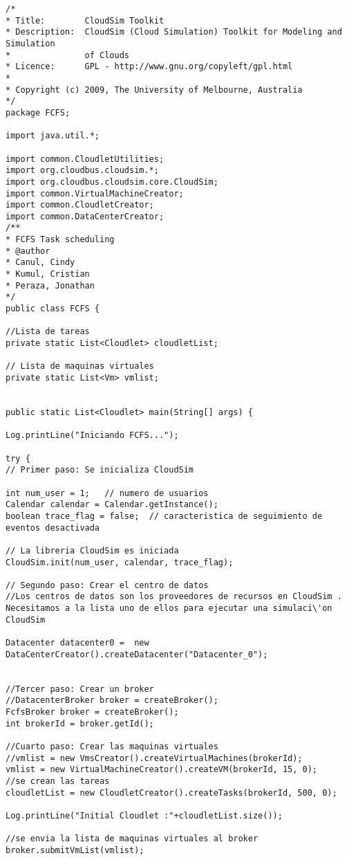 \begin{lstlisting}
/*
* Title:        CloudSim Toolkit
* Description:  CloudSim (Cloud Simulation) Toolkit for Modeling and Simulation
*               of Clouds
* Licence:      GPL - http://www.gnu.org/copyleft/gpl.html
*
* Copyright (c) 2009, The University of Melbourne, Australia
*/
package FCFS;

import java.util.*;

import common.CloudletUtilities;
import org.cloudbus.cloudsim.*;
import org.cloudbus.cloudsim.core.CloudSim;
import common.VirtualMachineCreator;
import common.CloudletCreator;
import common.DataCenterCreator;
/**
* FCFS Task scheduling
* @author
* Canul, Cindy
* Kumul, Cristian
* Peraza, Jonathan
*/
public class FCFS {

//Lista de tareas
private static List<Cloudlet> cloudletList;

// Lista de maquinas virtuales
private static List<Vm> vmlist;


public static List<Cloudlet> main(String[] args) {

Log.printLine("Iniciando FCFS...");

try {
// Primer paso: Se inicializa CloudSim

int num_user = 1;   // numero de usuarios
Calendar calendar = Calendar.getInstance();
boolean trace_flag = false;  // caracteristica de seguimiento de eventos desactivada

// La libreria CloudSim es iniciada
CloudSim.init(num_user, calendar, trace_flag);

// Segundo paso: Crear el centro de datos
//Los centros de datos son los proveedores de recursos en CloudSim . Necesitamos a la lista uno de ellos para ejecutar una simulaci\'on CloudSim

Datacenter datacenter0 =  new DataCenterCreator().createDatacenter("Datacenter_0");


//Tercer paso: Crear un broker
//DatacenterBroker broker = createBroker();
FcfsBroker broker = createBroker();
int brokerId = broker.getId();

//Cuarto paso: Crear las maquinas virtuales
//vmlist = new VmsCreator().createVirtualMachines(brokerId);
vmlist = new VirtualMachineCreator().createVM(brokerId, 15, 0);
//se crean las tareas
cloudletList = new CloudletCreator().createTasks(brokerId, 500, 0);

Log.printLine("Initial Cloudlet :"+cloudletList.size());

//se envia la lista de maquinas virtuales al broker
broker.submitVmList(vmlist);



\end{lstlisting}
